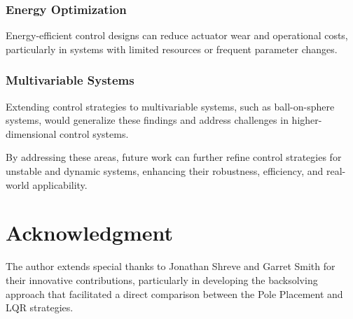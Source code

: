 \documentclass[conference]{IEEEtran}
\begin{document}
\subsubsection{Energy Optimization}
Energy-efficient control designs can reduce actuator wear and operational costs, particularly in systems with limited resources or frequent parameter changes.

\subsubsection{Multivariable Systems}
Extending control strategies to multivariable systems, such as ball-on-sphere systems, would generalize these findings and address challenges in higher-dimensional control systems.


By addressing these areas, future work can further refine control strategies for unstable and dynamic systems, enhancing their robustness, efficiency, and real-world applicability.


\section*{Acknowledgment}
The author extends special thanks to Jonathan Shreve and Garret Smith for their innovative contributions, particularly in developing the backsolving approach that facilitated a direct comparison between the Pole Placement and LQR strategies.



\end{document}
